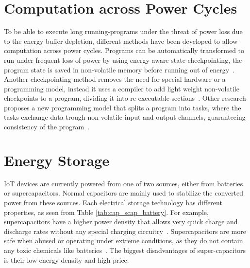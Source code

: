 \section{Computation across Power Cycles}
\label{sec:rw_comp_pc} 

To be able to execute long running-programs under the threat of power loss due to the energy buffer depletion, different methods have been developed to allow computation across power cycles.
Programs can be automatically transformed to run under frequent loss of power by using energy-aware state checkpointing, the program state is saved in non-volatile memory before running out of energy~\cite{ransford_asplos_2011}.
Another checkpointing method removes the need for special hardware or a programming model, instead it uses a compiler to add light weight non-volatile checkpoints to a program, dividing it into re-executable sections~\cite{vanderwoude_osdi_2016}.
Other research proposes a new programming model that splits a program into tasks, where the tasks exchange data trough non-volatile input and output channels, guaranteeing consistency of the program~\cite{Colin_oopsla_2017}.


\section{Energy Storage}
\label{sec:rw_energy_storage}




IoT devices are currently powered from one of two sources, either from batteries or supercapacitors.
Normal capacitors are mainly used to stabilize the converted power from these sources.
Each electrical storage technology has different properties, as seen from Table \ref{tab:cap_scap_battery}.
For example, supercapacitors have a higher power density that allows very quick charge and discharge rates without any special charging circuitry~\cite{prasad_comst_2014}.
Supercapacitors are more safe when abused or operating under extreme conditions, as they do not contain any toxic chemicals like batteries~\cite{maxwell_overview_2017}.
The biggest disadvantages of super-capacitors is their low energy density and high price.

